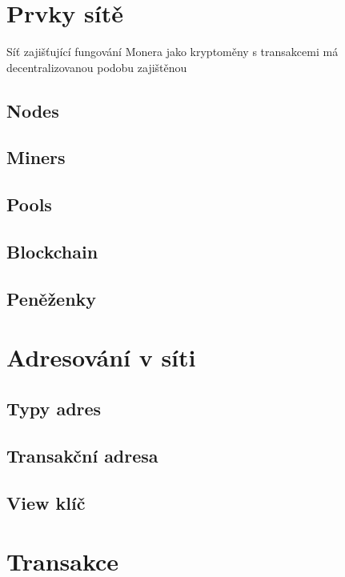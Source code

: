 \documentclass[
  printed, %
  table,   %
  nolof,     %
  nolot,     %
           oneside, color
]{fithesis3}
\begin{document}
\section{Prvky sítě}
Síť zajišťující fungování Monera jako kryptoměny s transakcemi má decentralizovanou podobu zajištěnou 
\subsection{Nodes}
\subsection{Miners}
\subsection{Pools}
\subsection{Blockchain}
\label{sec:blockchain}
\subsection{Peněženky}

\section{Adresování v síti}
\subsection{Typy adres}
\subsection{Transakční adresa}
\subsection{View klíč}
\section{Transakce}
\end{document}
